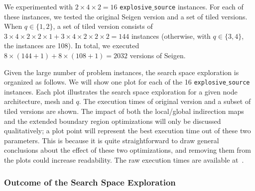 We experimented with $2 \times 4 \times 2 = 16$ {\tt explosive$\_$source} instances. For each of these instances, we tested the original Seigen version and a set of tiled versions. When $q \in \lbrace 1, 2 \rbrace$, a set of tiled version consists of $3 \times 4 \times 2 \times 2 \times 1 + 3 \times 4 \times 2 \times 2 \times 2 = 144$ instances (otherwise, with $q \in \lbrace 3, 4 \rbrace$, the instances are 108). In total, we executed $8 \times (144 + 1) + 8 \times (108 + 1) = 2032$ versions of Seigen. 

Given the large number of problem instances, the search space exploration is organized as follows. We will show one plot for each of the 16 {\tt explosive$\_$source} instances. Each plot illustrates the search space exploration for a given node architecture, mesh and $q$. The execution times of original version and a subset of tiled versions are shown. The impact of both the local/global indirection maps and the extended boundary region optimizations will only be discussed qualitatively; a plot point will represent the best execution time out of these two parameters. This is because it is quite straightforward to draw general conclusions about the effect of these two optimizations, and removing them from the plots could increase readability. The raw execution times are available at~\cite{seigen-times-raw-values}.

\subsubsection{Outcome of the Search Space Exploration}

